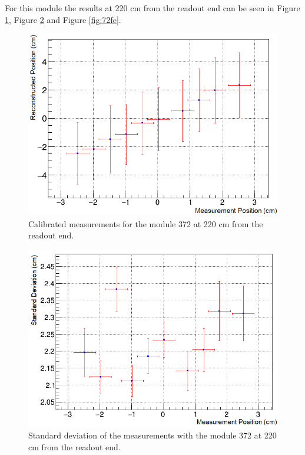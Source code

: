 \documentclass[a4paper]{article}\linespread{1.4}
\begin{document}
For this module the results at 220 cm from the readout end can be seen in Figure \ref{fig:72fm}, Figure \ref{fig:72fs} and Figure \ref{fig:72fe}. 
\begin{figure}[h!] \hspace*{-0cm} \includegraphics[width=120mm,scale=2.0]{72fm.png} \caption{Calibrated measurements for the module 372 at 220 cm from the readout end.}  \label{fig:72fm}\end{figure}
\begin{figure}[h!] \hspace*{-0cm} \includegraphics[width=120mm,scale=2.0]{72fs.png} \caption{Standard deviation of the measurements with the module 372 at 220 cm from the readout end.}  \label{fig:72fs}\end{figure}
\end{document}
